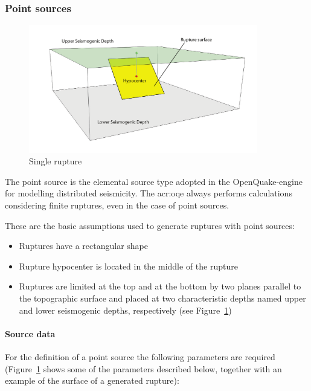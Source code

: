 \subsubsection{Point sources}
\label{subsubsec:point_sources}

\begin{figure}[!ht]
\centering
\includegraphics[width=10cm]{figures/hazard/single_rupture.pdf}
\caption{Single rupture}
\label{fig:single_rupture}
\end{figure}

The point source is the elemental source type adopted in the OpenQuake-engine
for modelling distributed seismicity. The \glsdesc{acr:oqe} always performs
calculations considering finite ruptures, even in the case of point sources.

These are the basic assumptions used to generate ruptures with point sources:

\begin{itemize}

    \item Ruptures have a rectangular shape

    \item Rupture hypocenter is located in the middle of the rupture

    \item Ruptures are limited at the top and at the bottom by two planes
    parallel to the topographic surface and placed at two characteristic
    depths named upper and lower seismogenic depths, respectively (see
    Figure~\ref{fig:single_rupture})

\end{itemize}

\paragraph{Source data}

For the definition of a point source the following parameters are required
(Figure~\ref{fig:single_rupture} shows some of the parameters described
below, together with an example of the surface of a generated rupture):

